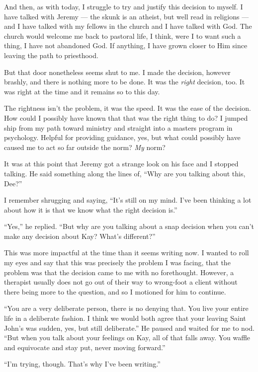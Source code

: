 And then, as with today, I struggle to try and justify this decision to myself. I have talked with Jeremy --- the skunk is an atheist, but well read in religions --- and I have talked with my fellows in the church and I have talked with God. The church would welcome me back to pastoral life, I think, were I to want such a thing, I have not abandoned God. If anything, I have grown closer to Him since leaving the path to priesthood.

But that door nonetheless seems shut to me. I made the decision, however brashly, and there is nothing more to be done. It was the \emph{right} decision, too. It was right at the time and it remains so to this day.

The rightness isn't the problem, it was the speed. It was the ease of the decision. How could I possibly have known that that was the right thing to do? I jumped ship from my path toward ministry and straight into a masters program in psychology. Helpful for providing guidance, yes, but what could possibly have caused me to act so far outside the norm? \emph{My} norm?

It was at this point that Jeremy got a strange look on his face and I stopped talking. He said something along the lines of, ``Why are you talking about this, Dee?''

I remember shrugging and saying, ``It's still on my mind. I've been thinking a lot about how it is that we know what the right decision is.''

``Yes,'' he replied. ``But why are you talking about a snap decision when you can't make any decision about Kay? What's different?''

This was more impactful at the time than it seems writing now. I wanted to roll my eyes and say that this was precisely the problem I was facing, that the problem was that the decision came to me with no forethought. However, a therapist usually does not go out of their way to wrong-foot a client without there being more to the question, and so I motioned for him to continue.

``You are a very deliberate person, there is no denying that. You live your entire life in a deliberate fashion. I think we would both agree that your leaving Saint John's was sudden, yes, but still deliberate.'' He paused and waited for me to nod. ``But when you talk about your feelings on Kay, all of that falls away. You waffle and equivocate and stay put, never moving forward.''

``I'm trying, though. That's why I've been writing.''


